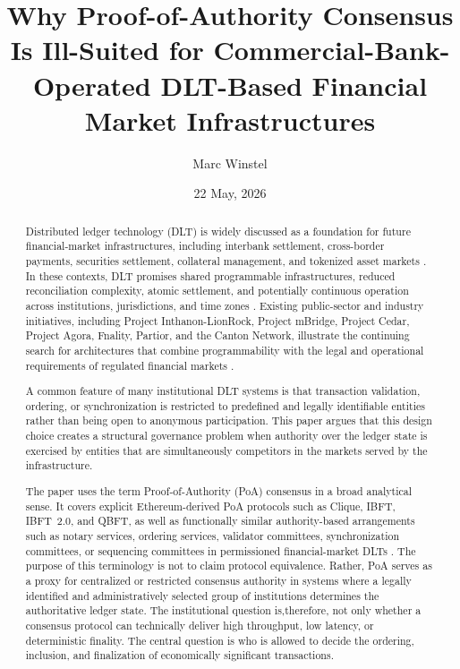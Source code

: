 \documentclass[
reprint,
showkeys,
superscriptaddress,
aps,
pra,
longbibliography,
nofootinbib
]{revtex4-2}
\begin{document}
	
\title{Why Proof-of-Authority Consensus Is Ill-Suited for Commercial-Bank-Operated DLT-Based Financial Market Infrastructures}
	
	\author{Marc Winstel}
	
	\date{22 May, 2026}
	
	\begin{abstract}
		Distributed ledger technology (DLT) is widely discussed as a foundation for future financial-market infrastructures, including interbank settlement, cross-border payments, securities settlement, collateral management, and tokenized asset markets \cite{bisUnifiedLedger2025,oecdTokenisation2024,cpmiDlt2017,ecbDlt2016}. 
		In these contexts, DLT promises shared programmable infrastructures, reduced reconciliation complexity, atomic settlement, and potentially continuous operation across institutions, jurisdictions, and time zones \cite{cpmiDlt2017,bisUnifiedLedger2023}. 
		Existing public-sector and industry initiatives, including Project Inthanon-LionRock, Project mBridge, Project Cedar, Project Agora, Fnality, Partior, and the Canton Network, illustrate the continuing search for architectures that combine programmability with the legal and operational requirements of regulated financial markets \cite{inthanonLionrock2020,bisMbridge2022,nyicCedarAppendix,bis_press_agora_2024,bis_bulletin87_2024,fnality,partior,canton_network_whitepaper_2024}. 
		
		A common feature of many institutional DLT systems is that transaction validation, ordering, or synchronization is restricted to predefined and legally identifiable entities rather than being open to anonymous participation. 
		This paper argues that this design choice creates a structural governance problem when authority over the ledger state is exercised by entities that are simultaneously competitors in the markets served by the infrastructure.
		
		The paper uses the term Proof-of-Authority (PoA) consensus in a broad analytical sense. It covers explicit Ethereum-derived PoA protocols such as Clique, IBFT, IBFT~2.0, and QBFT, as well as functionally similar authority-based arrangements such as notary services, ordering services, validator committees, synchronization committees, or sequencing committees in permissioned financial-market DLTs \cite{szilagyi2017clique,moniz2020ibft,saltini2019ibft2,besuPoa,goquorumConsensus,cordaNotary,fabricOrdering,canton_network_whitepaper_2024}. 
		The purpose of this terminology is not to claim protocol equivalence. 
		Rather, PoA serves as a proxy for centralized or restricted consensus authority in systems where a legally identified and administratively selected group of institutions determines the authoritative ledger state. 
		The institutional question is,therefore, not only whether a consensus protocol can technically deliver high throughput, low latency, or deterministic finality. 
		The central question is who is allowed to decide the ordering, inclusion, and finalization of economically significant transactions.
		

\end{abstract}
\end{document}
